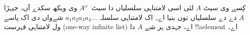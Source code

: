 \documentclass[../../../include/open-logic-section]{subfiles}
\begin{document}
\begin{ex}
کِسے وی سیٹ $A$ لئی اسی لامتناہی سلسلیاں دا سیٹ~$A^\omega$ وی ویکھ سکدے آں،
جیہڑا $A$ دے  دے سلسلیاں توں بنیا اے۔ اک لامتناہی سلسلہ
$a_1a_2a_3a_4\dots$ شےواں دی اک پاسے ول لامتناہی فہرست (one-way infinite
list) اے، جہدی ہر
شے $A$ دا !!a{element} اے۔
\end{ex}
\end{document}
